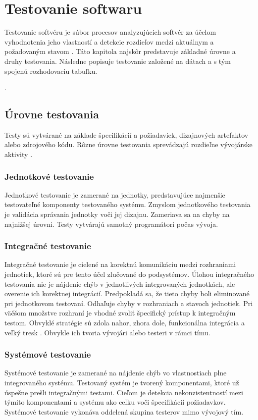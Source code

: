 \chapter{Testovanie softwaru}
\label{testing}
Testovanie softvéru je súbor procesov analyzujúcich softvér za účelom vyhodnotenia jeho vlastností a detekcie rozdieľov medzi aktuálnym a požadovaným stavom \cite{Standard}. Táto kapitola najskôr predstavuje základné úrovne a druhy testovania. Následne popisuje testovanie založené na dátach a s tým spojenú rozhodovaciu tabuľku.



 \cite{Ist}\cite{Gst}\cite{Ast}\cite{Tgp}\cite{Dig}\cite{Testos}\cite{Standard}.
\bigskip
\section{Úrovne testovania}
Testy sú vytvárané na základe špecifikácií a požiadaviek, dizajnových artefaktov alebo zdrojového kódu. Rôzne úrovne testovania sprevádzajú rozdieľne vývojárske aktivity \cite{Ist}.
\subsection*{Jednotkové testovanie}
Jednotkové testovanie je zamerané na jednotky, predstavujúce najmenšie testovateľné komponenty testovaného systému. Zmyslom jednotkového testovania je validácia správania jednotky voči jej dizajnu. Zameriava sa na chyby na najnižšej úrovni. Testy vytvárajú samotný programátori počas vývoja.    
\subsection*{Integračné testovanie}
Integračné testovanie je cielené na korektnú komunikáciu medzi rozhraniami jednotiek, ktoré sú pre tento účel zlučované do podsystémov. Úlohou integračného testovania nie je nájdenie chýb v jednotlivých integrovaných jednotkách, ale overenie ich korektnej integrácií. Predpokladá sa, že tieto chyby boli eliminované pri jednotkovom testovaní. Odhaľuje chyby v rozhraniach a stavoch jednotiek. Pri väčšom množstve rozhraní je vhodné zvoliť špecifický prístup k integračným testom. Obvyklé stratégie sú zdola nahor, zhora dole, funkcionálna integrácia a veľký tresk \cite{Gst}. Obvykle ich tvoria vývojári alebo testeri v rámci tímu.
\subsection*{Systémové testovanie}
Systémové testovanie je zamerané na nájdenie chýb vo vlastnostiach plne integrovaného systému. Testovaný systém je tvorený komponentami, ktoré už úspešne prešli integračnými testami. Cieľom je detekcia nekonzistentností mezi týmito komponentami a systému ako ceľku voči špecifikácií požiadavkov. Systémové testovanie vykonáva oddelená skupina testerov mimo vývojový tím. 
